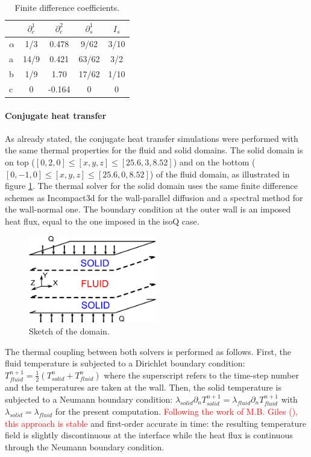 \documentclass[review]{elsarticle}
\begin{document}
\begin{table}[htbp]
\begin{center}
\begin{tabular}[htbp]{|l|c|c|c|c|}
\hline
 & $\partial_c^1$ & $\partial_c^2$ & $\partial_s^1$ & $I_s$ \\ \hline
$\alpha$ & 1/3 & 0.478 & 9/62 & 3/10 \\ \hline
a & 14/9 & 0.421 & 63/62 & 3/2 \\ \hline
b & 1/9 & 1.70 & 17/62 & 1/10 \\ \hline
c & 0 & -0.164 & 0 & 0 \\ \hline
\end{tabular}
\end{center}
\caption{Finite difference coefficients.}
\label{table2}
\end{table}

\paragraph{Conjugate heat transfer} As already stated, the conjugate heat transfer simulations were performed with the same thermal properties for the fluid and solid domains.
The solid domain is on top ($[0,2,0] \leq [x,y,z] \leq [25.6,3,8.52]$) and on the bottom ($[0,-1,0] \leq [x,y,z] \leq [25.6,0,8.52]$) of the fluid domain, as illustrated in figure \ref{sketch}.
The thermal solver for the solid domain uses the same finite difference schemes as Incompact3d for the wall-parallel diffusion and a spectral method for the wall-normal one.
The boundary condition at the outer wall is an imposed heat flux, equal to the one imposed in the isoQ case.

\begin{figure}[htbp]
\centering
\includegraphics[width=0.5\textwidth]{./domaine.jpg}
\caption{Sketch of the domain.}
\label{sketch}
\end{figure}

The thermal coupling between both solvers is performed as follows.
First, the fluid temperature is subjected to a Dirichlet boundary condition: $T_{fluid}^{n+1}=\frac{1}{2}\left(T_{solid}^n+T_{fluid}^n\right)$ where the superscript refers to the time-step number and the temperatures are taken at the wall.
Then, the solid temperature is subjected to a Neumann boundary condition: $\lambda_{solid} \partial_n T_{solid}^{n+1}=\lambda_{fluid} \partial_n T_{fluid}^{n+1}$ with $\lambda_{solid} = \lambda_{fluid}$ for the present computation.
\textcolor{red}{Following the work of M.B. Giles (\cite{giles1997stability}), this approach is stable} and first-order accurate in time: the resulting temperature field is slightly discontinuous at the interface while the heat flux is continuous through the Neumann boundary condition.
\end{document}
